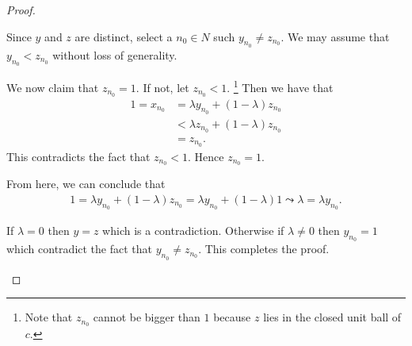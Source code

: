 \begin{proof}
\begin{enumerate}[label=(\alph*)]
     Since $y$ and $z$ are distinct, select a $n_{0}\in N$ such $y_{n_{0}} \ne z_{n_{0}}$. We may assume that $y_{n_{0}} < z_{n_{0}}$ without loss of generality.

     We now claim that $z_{n_{0}} =1$. If not, let $z_{n_{0}} < 1$. \footnote{Note that $z_{n_{0}}$ cannot be bigger than $1$ because $z$ lies in the closed unit ball of $c$.} Then we have that 
     \begin{align*}
	 1=x_{n_{0}} &= \lambda y_{n_{0}} + \left( 1-\lambda \right) z_{n_{0}} \\
	 &< \lambda z_{n_{0}} + \left( 1-\lambda \right) z_{n_{0}} \\
	 &= z_{n_{0}}.
     \end{align*}
     This contradicts the fact that $z_{n_{0}} < 1$. Hence $z_{n_{0}} = 1$.

     From here, we can conclude that
     \begin{align*}
	 1 = \lambda y_{n_{0}} + \left( 1-\lambda \right) z_{n_{0}}
	= \lambda y_{n_{0}} + \left( 1-\lambda \right) 1 
	\leadsto \lambda = \lambda y_{n_0} .
     \end{align*}

     If $\lambda = 0$ then $y=z$ which is a contradiction. Otherwise if $\lambda \ne 0$ then $y_{n_0} =1$ which contradict the fact that $y_{n_{0}}\ne z_{n_{0}}$. This completes the proof.
    \end{enumerate}
\end{proof} 
